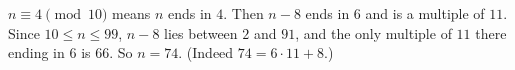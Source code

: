 $n\equiv4\pmod{10}$ means $n$ ends in $4$. Then $n-8$ ends in $6$ and is a multiple of $11$. Since $10\le n\le99$, $n-8$ lies between $2$ and $91$, and the only multiple of $11$ there ending in $6$ is $66$. So $n=\boxed{74}$. (Indeed $74=6\cdot11+8$.)
